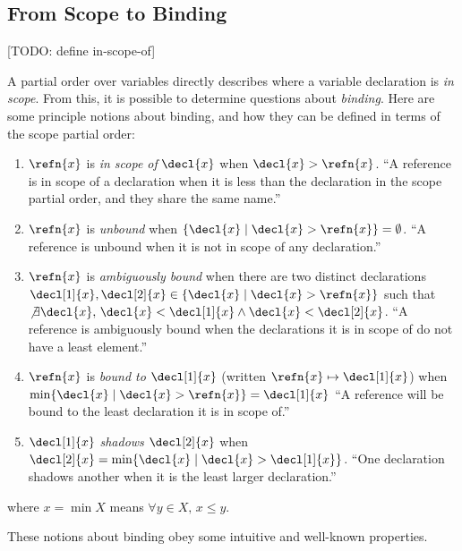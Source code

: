 \documentclass[preprint]{sigplanconf}
\theoremstyle{plain}
\newcommand{\bound}{\mapsto}
\newcommand{\NotExists}[1]{\not\exists{#1},\,}
\newcommand{\Forall}[1]{\forall{#1},\,}
\newcommand{\mand}{\wedge}
\begin{document}
\subsection{From Scope to Binding}

[TODO: define in-scope-of]

A partial order over variables directly describes where a variable
declaration is \emph{in scope}. From this, it is possible to determine
questions about \emph{binding}. Here are some principle notions about
binding, and how they can be defined in terms of the scope partial
order:
\begin{enumerate}
\item $\refn{x}$ is \emph{in scope of} $\decl{x}$ when $\decl{x} >
  \refn{x}$.
``A reference is in scope of a declaration when it is less than the
  declaration in the scope partial order, and they share the same name.''
\item $\refn{x}$ is \emph{unbound} when
$\{\decl{x} \mid \decl{x} > \refn{x}\} = \emptyset$.
``A reference is unbound when it is not in scope of any declaration.''
\item $\refn{x}$ is \emph{ambiguously bound} when there are two
distinct declarations
$\decl[1]{x}, \decl[2]{x} \in \{\decl{x} \mid \decl{x} > \refn{x}\}$
such that $\NotExists{\decl{x}}
  \decl{x} < \decl[1]{x} \mand \decl{x} < \decl[2]{x}$.
``A reference is ambiguously bound when the declarations it is in
  scope of do not have a least element.''
\item $\refn{x}$ is \emph{bound to} $\decl[1]{x}$
(written $\refn{x} \bound \decl[1]{x}$)
when $\min \{\decl{x} \mid \decl{x} > \refn{x}\} = \decl[1]{x}$
``A reference will be bound to the least declaration it is in scope of.''
\item $\decl[1]{x}$ \emph{shadows} $\decl[2]{x}$ when
$\decl[2]{x} = \min \{\decl{x} \mid \decl{x} > \decl[1]{x}\}$.
``One declaration shadows another when it is the least larger
  declaration.''
\end{enumerate}
where $x = \min X$ means $\Forall{y \in X} x \leq y$.

These notions about binding obey some intuitive and well-known
properties.
\end{document}
